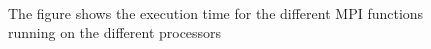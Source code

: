 \begin{figure}[h!] 
 \center 
  \\
 \caption{ The figure shows the execution time for the different MPI functions running on the different processors \label{fig:}}
 \end{figure}

